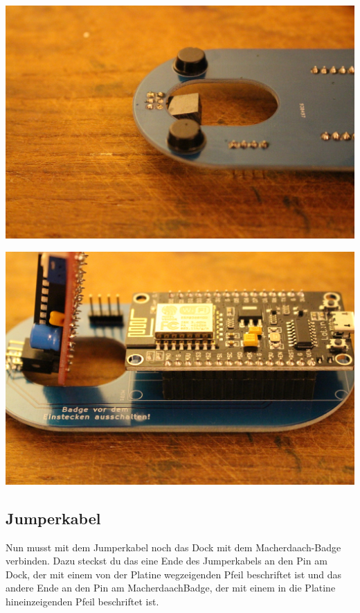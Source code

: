 \documentclass{article}
\begin{document}
\begin{minipage}[b]{0.5\textwidth}
	\includegraphics[width=\textwidth]{Bilder2019/IMG_6488.JPG}
\end{minipage}
\begin{minipage}[b]{0.5\textwidth}
	\includegraphics[width=\textwidth]{Bilder2019/IMG_6489.JPG}
\end{minipage}

\subsection{Jumperkabel}

Nun musst mit dem Jumperkabel noch das Dock mit dem Macherdaach-Badge verbinden. Dazu steckst du das eine Ende des Jumperkabels an den Pin am Dock, der mit einem von der Platine wegzeigenden Pfeil beschriftet ist und das andere Ende an den Pin am MacherdaachBadge, der mit einem in die Platine hineinzeigenden Pfeil beschriftet ist.
\end{document}
